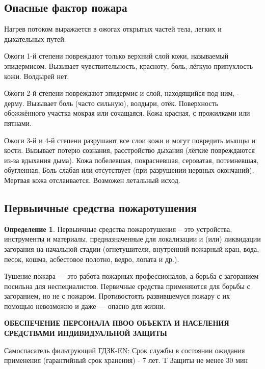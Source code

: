 \documentclass[a4paper, 12pt]{article}
\theoremstyle{definition}
\newtheorem*{definition}{Определение}
\begin{document}
        \subsection{Опасные фактор пожара}

        Нагрев потоком выражается в ожогах открытых частей тела, легких и дыхательных путей.

        Ожоги 1-й степени повреждают только верхний слой кожи, называемый эпидермисом. Вызывает чувствительность, красноту, боль, лёгкую припухлость кожи. Волдырей нет.

        Ожоги 2-й степени повреждают эпидермис и слой, находящийся под ним, - дерму. Вызывает боль (часто сильную), волдыри, отёк. Поверхность обожжённого участка мокрая или сочащаяся. Кожа красная, с прожилками или пятнами.

        Ожоги 3-й и 4-й степени разрушают все слои кожи и могут повредить мышцы и кости. Вызывает потерю сознания, расстройство дыхания (лёгкие повреждаются из-за вдыхания дыма). Кожа побелевшая, покрасневшая, сероватая, потемневшая, обугленная. Боль слабая или отсутствует (при разрушении нервных окончаний). Мертвая кожа отслаивается. Возможен летальный исход.

        \subsection{Первыичные средства пожаротушения}

        \begin{definition}
            Первыичные средства пожаротушения -- это устройства, инструменты и материалы, предназначенные для локализации и (или) ликвидации загорания на начальной стадии (огнетушители, внутренний пожарный кран, вода, песок, кошма, асбестовое полотно, ведро, лопата и др.). 
        \end{definition}

        Тушение пожара — это работа пожарных-профессионалов, а борьба с загоранием посильна для неспециалистов.  Первичные средства применяются для борьбы с загоранием, но не с пожаром. Противостоять развившемуся пожару с их помощью невозможно и даже — опасно для жизни.

        \begin{center}
            \textbf{ОБЕСПЕЧЕНИЕ  ПЕРСОНАЛА ПВОО ОБЪЕКТА И НАСЕЛЕНИЯ СРЕДСТВАМИ ИНДИВИДУАЛЬНОЙ ЗАЩИТЫ }
        \end{center}

        Самоспасатель фильтрующий ГДЗК-EN:
        Срок службы в состоянии ожидания применения (гарантийный срок хранения) - 7 лет. T Защиты не менее 30 мин
\end{document}
